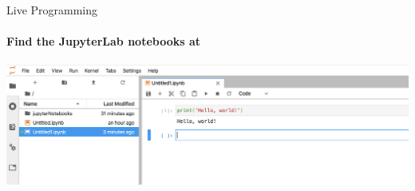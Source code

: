 \begin{frame}{Live Programming}
\framesubtitle{Find the JupyterLab notebooks at \myurl{\homepageslides}}
\centering 
\includegraphics[width=1.0\textwidth]{figures/HelloWorldjupyterlab}
\end{frame}